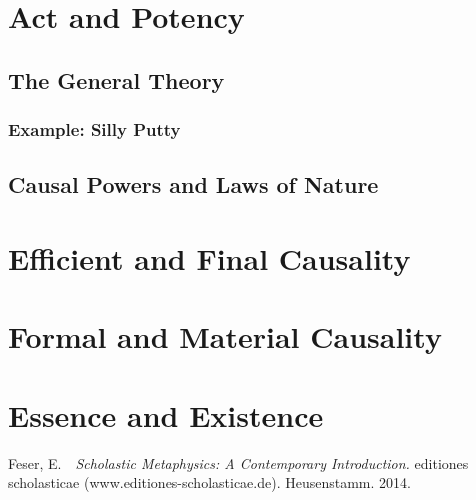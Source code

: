 \documentclass{article}
\begin{document}
\section{Act and Potency}

\subsection{The General Theory}

\subsubsection{Example: Silly Putty}

\subsection{Causal Powers and Laws of Nature}

\section{Efficient and Final Causality}

\section{Formal and Material Causality}

\section{Essence and Existence}



\begin{thebibliography}{}

Feser, E.\ \ {\it Scholastic Metaphysics: A Contemporary Introduction.}
      editiones scholasticae (www.editiones-scholasticae.de). Heusenstamm.
      2014.

\end{thebibliography}
\end{document}
